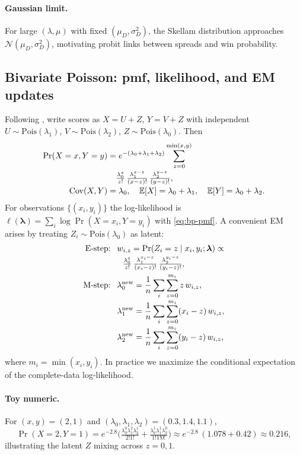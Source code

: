 \paragraph{Gaussian limit.} For large $(\lambda,\mu)$ with fixed $(\mu_D,\sigma_D^2)$, the Skellam
distribution approaches $\mathcal{N}(\mu_D,\sigma_D^2)$, motivating probit links between spreads and win probability.

\subsection{Bivariate Poisson: pmf, likelihood, and EM updates}\label{subsec:bp-pmf}
Following , write scores as $X=U+Z$, $Y=V+Z$ with independent
$U\sim\mathrm{Pois}(\lambda_1)$, $V\sim\mathrm{Pois}(\lambda_2)$, $Z\sim\mathrm{Pois}(\lambda_0)$. Then
\begin{align}
\Pr(X=x,Y=y)
&= e^{-(\lambda_0+\lambda_1+\lambda_2)}\sum_{z=0}^{\min(x,y)} \notag\\[-2pt]
&\quad \tfrac{\lambda_0^z}{z!}\,\tfrac{\lambda_1^{x-z}}{(x-z)!}\,\tfrac{\lambda_2^{y-z}}{(y-z)!},\label{eq:bp-pmf}\\[-2pt]
\mathrm{Cov}(X,Y) &= \lambda_0,\quad \mathbb{E}[X]=\lambda_0+\lambda_1,\quad \mathbb{E}[Y]=\lambda_0+\lambda_2.
\end{align}
For observations $\{(x_i,y_i)\}$ the log-likelihood is $\ell(\boldsymbol\lambda)=\sum_i \log \Pr(X=x_i,Y=y_i)$ with \eqref{eq:bp-pmf}. A convenient EM arises by treating $Z_i\sim\mathrm{Pois}(\lambda_0)$ as latent:
\begin{align}
\text{E-step: } &\ w_{i,z}=\Pr(Z_i=z\mid x_i,y_i;\boldsymbol\lambda) \propto \notag\\[-2pt]
&\quad \tfrac{\lambda_0^z}{z!}\,\tfrac{\lambda_1^{x_i-z}}{(x_i-z)!}\,\tfrac{\lambda_2^{y_i-z}}{(y_i-z)!},\label{eq:bp-weights}\\
\text{M-step: } &\ \lambda_0^{\text{new}}=\frac{1}{n}\sum_i \sum_{z=0}^{m_i} z\,w_{i,z},\notag\\[-2pt]
&\ \lambda_1^{\text{new}}=\frac{1}{n}\sum_i \sum_{z=0}^{m_i} (x_i-z)\,w_{i,z},\notag\\[-2pt]
&\ \lambda_2^{\text{new}}=\frac{1}{n}\sum_i \sum_{z=0}^{m_i} (y_i-z)\,w_{i,z},
\end{align}
where $m_i=\min(x_i,y_i)$. In practice we maximize the conditional expectation of the complete-data log-likelihood.

\paragraph{Toy numeric.} For $(x,y)=(2,1)$ and $(\lambda_0,\lambda_1,\lambda_2)=(0.3,1.4,1.1)$,
\[\Pr(X=2,Y=1)=e^{-2.8}\Big(\tfrac{\lambda_0^0\lambda_1^2\lambda_2^1}{2!1!}+\tfrac{\lambda_0^1\lambda_1^1\lambda_2^0}{1!1!0!}\Big)\approx e^{-2.8}\,(1.078+0.42)\approx 0.216,\]
illustrating the latent $Z$ mixing across $z=0,1$.

